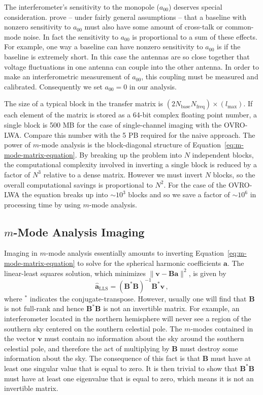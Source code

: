 \documentclass[twocolumn]{aastex61}
\renewcommand{\b}{\pmb}
\begin{document}
The interferometer's sensitivity to the monopole ($a_{00}$) deserves special consideration.
\citet{2016ApJ...826..116V} prove -- under fairly general assumptions -- that a baseline with
nonzero sensitivity to $a_{00}$ must also have some amount of cross-talk or common-mode noise.  In
fact the sensitivity to $a_{00}$ is proportional to a sum of these effects. For example, one way a
baseline can have nonzero sensitivity to $a_{00}$ is if the baseline is extremely short. In this
case the antennas are so close together that voltage fluctuations in one antenna can couple into the
other antenna. In order to make an interferometric measurement of $a_{00}$, this coupling must be
measured and calibrated. Consequently we set $a_{00}=0$ in our analysis.

The size of a typical block in the transfer matrix is
$(2N_\text{base}N_\text{freq})\times(l_\text{max})$. If each element of the matrix is stored as a
64-bit complex floating point number, a single block is 500 MB for the case of single-channel
imaging with the OVRO-LWA. Compare this number with the 5 PB required for the naive approach.  The
power of $m$-mode analysis is the block-diagonal structure of
Equation~\ref{eq:m-mode-matrix-equation}.  By breaking up the problem into $N$ independent blocks,
the computational complexity involved in inverting a single block is reduced by a factor of $N^3$
relative to a dense matrix. However we must invert $N$ blocks, so the overall computational savings
is proportional to $N^2$.  For the case of the OVRO-LWA the equation breaks up into $\sim10^3$
blocks and so we save a factor of $\sim10^6$ in processing time by using $m$-mode analysis.

\subsection{$m$-Mode Analysis Imaging}

Imaging in $m$-mode analysis essentially amounts to inverting
Equation~\ref{eq:m-mode-matrix-equation} to solve for the spherical harmonic coefficients $\b a$.
The linear-least squares solution, which minimizes $\|\b v - \b B\b a\|^2$, is given by
\begin{equation}
    \b{\hat a}_\text{LLS} = (\b B^*\b B)^{-1}\b B^*\b v\,,
\end{equation}
where $^*$ indicates the conjugate-transpose. However, usually one will find that $\b B$ is not
full-rank and hence $\b B^*\b B$ is not an invertible matrix. For example, an interferometer located
in the northern hemisphere will never see a region of the southern sky centered on the southern
celestial pole. The $m$-modes contained in the vector $\b v$ must contain no information
about the sky around the southern celestial pole, and therefore the act of multiplying by $\b B$
must destroy some information about the sky. The consequence of this fact is that $\b B$ must have
at least one singular value that is equal to zero. It is then trivial to show that $\b B^*\b B$ must
have at least one eigenvalue that is equal to zero, which means it is not an invertible matrix.
\end{document}
